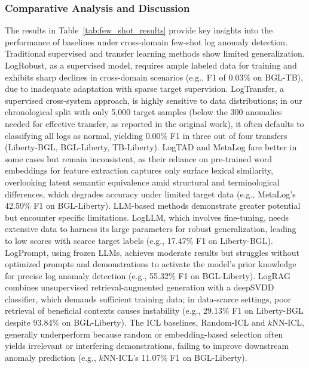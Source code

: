 \documentclass[lettersize,journal]{IEEEtran}
\begin{document}
\subsubsection{Comparative Analysis and Discussion}
The results in Table~\ref{tab:few_shot_results} provide key insights into the performance of baselines under cross-domain few-shot log anomaly detection.
Traditional supervised and transfer learning methods show limited generalization. LogRobust, as a supervised model, requires ample labeled data for training and exhibits sharp declines in cross-domain scenarios (e.g., F1 of 0.03\% on BGL-TB), due to inadequate adaptation with sparse target supervision. LogTransfer, a supervised cross-system approach, is highly sensitive to data distributions; in our chronological split with only 5,000 target samples (below the 300 anomalies needed for effective transfer, as reported in the original work), it often defaults to classifying all logs as normal, yielding 0.00\% F1 in three out of four transfers (Liberty-BGL, BGL-Liberty, TB-Liberty). LogTAD and MetaLog fare better in some cases but remain inconsistent, as their reliance on pre-trained word embeddings for feature extraction captures only surface lexical similarity, overlooking latent semantic equivalence amid structural and terminological differences, which degrades accuracy under limited target data (e.g., MetaLog's 42.59\% F1 on BGL-Liberty).
LLM-based methods demonstrate greater potential but encounter specific limitations. LogLLM, which involves fine-tuning, needs extensive data to harness its large parameters for robust generalization, leading to low scores with scarce target labels (e.g., 17.47\% F1 on Liberty-BGL). LogPrompt, using frozen LLMs, achieves moderate results but struggles without optimized prompts and demonstrations to activate the model's prior knowledge for precise log anomaly detection (e.g., 55.32\% F1 on BGL-Liberty). LogRAG combines unsupervised retrieval-augmented generation with a deepSVDD classifier, which demands sufficient training data; in data-scarce settings, poor retrieval of beneficial contexts causes instability (e.g., 29.13\% F1 on Liberty-BGL despite 93.84\% on BGL-Liberty). The ICL baselines, Random-ICL and $k$NN-ICL, generally underperform because random or embedding-based selection often yields irrelevant or interfering demonstrations, failing to improve downstream anomaly prediction (e.g., $k$NN-ICL's 11.07\% F1 on BGL-Liberty).
\end{document}

